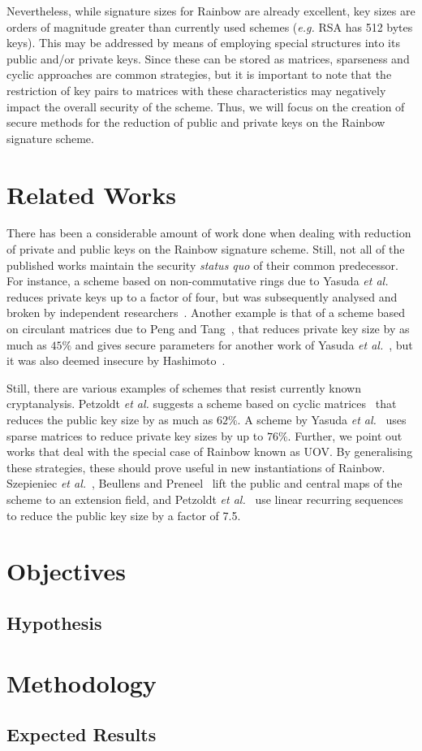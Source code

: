 \documentclass[10pt]{article}
\begin{document}
Nevertheless, while signature sizes for Rainbow are already excellent, key sizes are orders of magnitude greater than currently used schemes (\emph{e.g.} RSA has 512 bytes keys). This may be addressed by means of employing special structures into its public and/or private keys. Since these can be stored as matrices, sparseness and cyclic approaches are common strategies, but it is important to note that the restriction of key pairs to matrices with these characteristics may negatively impact the overall security of the scheme. Thus, we will focus on the creation of secure methods for the reduction of public and private keys on the Rainbow signature scheme.

\section{Related Works}

There has been a considerable amount of work done when dealing with reduction of private and public keys on the Rainbow signature scheme. Still, not all of the published works maintain the security \emph{status quo} of their common predecessor. For instance, a scheme based on non-commutative rings due to Yasuda \emph{et al.}~\cite{} reduces private keys up to a factor of four, but was subsequently analysed and broken by independent researchers~\cite{}. Another example is that of a scheme based on circulant matrices due to Peng and Tang~\cite{}, that reduces private key size by as much as $45\%$ and gives secure parameters for another work of Yasuda \emph{et al.}~\cite{}, but it was also deemed insecure by Hashimoto~\cite{}. 

Still, there are various examples of schemes that resist currently known cryptanalysis. Petzoldt \emph{et al.} suggests a scheme based on cyclic matrices~\cite{} that reduces the public key size by as much as $62\%$. A scheme by Yasuda \emph{et al.}~\cite{} uses sparse matrices to reduce private key sizes by up to $76\%$. Further, we point out works that deal with the special case of Rainbow known as UOV. By generalising these strategies, these should prove useful in new instantiations of Rainbow. Szepieniec \emph{et al.}~\cite{}, Beullens and Preneel~\cite{} lift the public and central maps of the scheme to an extension field, and Petzoldt \emph{et al.}~\cite{} use linear recurring sequences to reduce the public key size by a factor of 7.5.

\section{Objectives}

\subsection{Hypothesis}

\section{Methodology}

\subsection{Expected Results}



\end{document}
